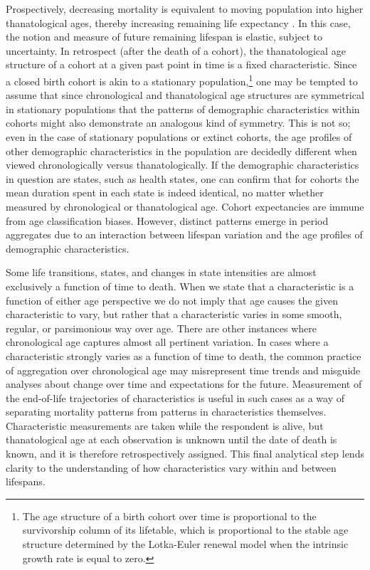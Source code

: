 \documentclass[11pt,oneside]{article} %
\begin{document}
Prospectively, decreasing mortality is equivalent to moving population into
higher thanatological ages, thereby increasing remaining life expectancy \citep{sanderson2005average}. In this case,
the notion and measure of future remaining lifespan is elastic, subject to
uncertainty.
In retrospect (after the death of a cohort), the thanatological age structure of
a cohort at a given past point in time is a fixed characteristic. Since a closed
birth cohort is akin to a stationary population,\footnote{The age structure of a birth cohort over time is proportional to the survivorship column of its lifetable, which is proportional to the stable age structure determined by the Lotka-Euler renewal model when the intrinsic growth rate is equal to zero.} one may be
tempted to assume that since chronological and thanatological age structures are
symmetrical in stationary populations
\citep{brouard1989mouvements,vaupel2009life,pancho2015} that the patterns of
demographic characteristics within cohorts might also demonstrate an
analogous kind of symmetry.
This is not so; even in the case of stationary populations or extinct cohorts,
the age profiles of other demographic characteristics in the population are decidedly different when
viewed chronologically versus thanatologically. If the demographic
characteristics in question are states, such as health states, one can confirm
that for cohorts the mean duration spent in each state is indeed identical, no
matter whether measured by chronological or thanatological age. Cohort
expectancies are immune from age classification biases. However, distinct
patterns emerge in period aggregates due to an interaction between lifespan
variation and the age profiles of demographic characteristics. 

Some life
transitions, states, and changes in state intensities are almost exclusively a
function of time to death. When we state that a characteristic is a
function of either age perspective we do not imply that age causes the given characteristic to vary, but rather that a characteristic varies in some smooth, regular, or parsimonious way over age. There are other instances where chronological age captures almost all pertinent variation. In cases where a characteristic strongly varies as a
function of time to death,
the common practice of aggregation over chronological age may misrepresent time
trends and misguide analyses about change over time and expectations for the
future. Measurement of the
end-of-life trajectories of characteristics is useful in such cases as a way of separating
mortality patterns from patterns in characteristics themselves.
Characteristic measurements are taken while the respondent is alive, but
thanatological age at each observation is unknown until the date of death is
known, and it is therefore retrospectively assigned. This final analytical step
lends clarity to the understanding of how characteristics vary within and
between lifespans.
\end{document}
